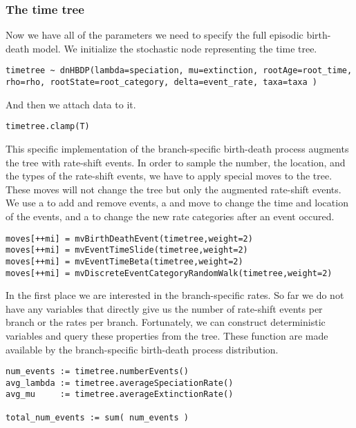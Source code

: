 \subsubsection{The time tree}

Now we have all of the parameters we need to specify the full episodic birth-death model. 
We initialize the stochastic node representing the time tree.
{\tt \begin{snugshade*}
\begin{lstlisting}
timetree ~ dnHBDP(lambda=speciation, mu=extinction, rootAge=root_time, rho=rho, rootState=root_category, delta=event_rate, taxa=taxa )
\end{lstlisting}
\end{snugshade*}}
And then we attach data to it.
{\tt \begin{snugshade*}
\begin{lstlisting}
timetree.clamp(T)
\end{lstlisting}
\end{snugshade*}}

This specific implementation of the branch-specific birth-death process augments the tree with rate-shift events.
In order to sample the number, the location, and the types of the rate-shift events, we have to apply special moves to the tree.
These moves will not change the tree but only the augmented rate-shift events.
We use a  to add and remove events, a  and  move to change the time and location of the events, 
and a  to change the new rate categories after an event occured.
{\tt \begin{snugshade*}
\begin{lstlisting}
moves[++mi] = mvBirthDeathEvent(timetree,weight=2)
moves[++mi] = mvEventTimeSlide(timetree,weight=2)
moves[++mi] = mvEventTimeBeta(timetree,weight=2)
moves[++mi] = mvDiscreteEventCategoryRandomWalk(timetree,weight=2)
\end{lstlisting}
\end{snugshade*}}

In the first place we are interested in the branch-specific rates.
So far we do not have any variables that directly give us the number of rate-shift events per branch or the rates per branch.
Fortunately, we can construct deterministic variables and query these properties from the tree.
These function are made available by the branch-specific birth-death process distribution.
{\tt \begin{snugshade*}
\begin{lstlisting}
num_events := timetree.numberEvents()
avg_lambda := timetree.averageSpeciationRate()
avg_mu     := timetree.averageExtinctionRate()

total_num_events := sum( num_events )
\end{lstlisting}
\end{snugshade*}}


